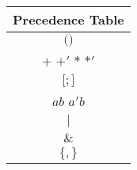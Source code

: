 \begin{tabular}{ |c| }
    \hline
    \textbf{Precedence Table} \\
    \hline
    $($\quad$)$ \\
    \hline
    $+$ \quad $+'$ \quad $*$ \quad $*'$ \\
    \hline
    $[$\quad$;$\quad$]$ \\
    \hline
    $ab$ \quad $a'b$ \\
    \hline
    $|$ \\
    \hline
    $\&$ \\
    \hline
    $\{$\quad$,$\quad$\}$ \\
    \hline
\end{tabular}